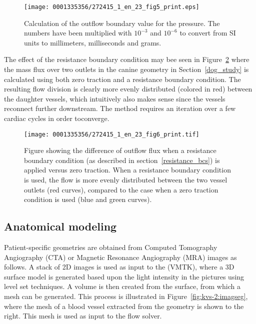\begin{figure}[!t]
\texttt{[image: 0001335356/272415\_1\_en\_23\_fig5\_print.eps]}
\caption{Calculation of the outflow boundary value for the pressure. The
numbers have been multiplied with $10^{-3}$
and $10^{-6}$ to convert from SI units to millimeters, milliseconds
and grams.}\label{fig:kvs-2:resistance_code}\vspace*{10pt}
\end{figure}

The effect of the resistance boundary condition may bee seen in
Figure~\ref{fig:kvs-2:resistance_bcs_fig} where the mass flux over two
outlets in the canine geometry in Section~\ref{dog_study} is
calculated using both zero traction and a resistance boundary
condition. The resulting flow division is clearly more evenly
distributed (colored in red) between the daughter vessels, which
intuitively also makes sense since the vessels reconnect further
downstream. The method requires an iteration over a few cardiac cycles
in order to\break converge.

\begin{figure}[!t]
\centering
\texttt{[image: 0001335356/272415\_1\_en\_23\_fig6\_print.tif]}
\caption{Figure showing the difference of outflow
flux when a resistance boundary condition (as described in section~\ref{resistance_bcs}) is applied versus zero traction. When a resistance boundary condition is used, the flow is more evenly distributed between the two vessel outlets (red curves), compared to the case when a zero traction condition is used (blue and green curves).}\label{fig:kvs-2:resistance_bcs_fig}
\end{figure}

\subsection{Anatomical modeling} \label{vmtk}

Patient-specific geometries are obtained from Computed Tomography
Angiography (CTA) or Magnetic Resonance Angiography (MRA) images as
follows. A stack of 2D images is used as input to the \citet{vmtk} (VMTK),
where a 3D surface model is generated based upon the light intensity
in the pictures using level set techniques. A volume is then created
from the surface, from which a mesh can be generated. This process is
illustrated in Figure~\ref{fig:kvs-2:imagseg}, where the mesh of a
blood vessel extracted from the geometry is shown to the right. This
mesh is used as input to the flow solver.


